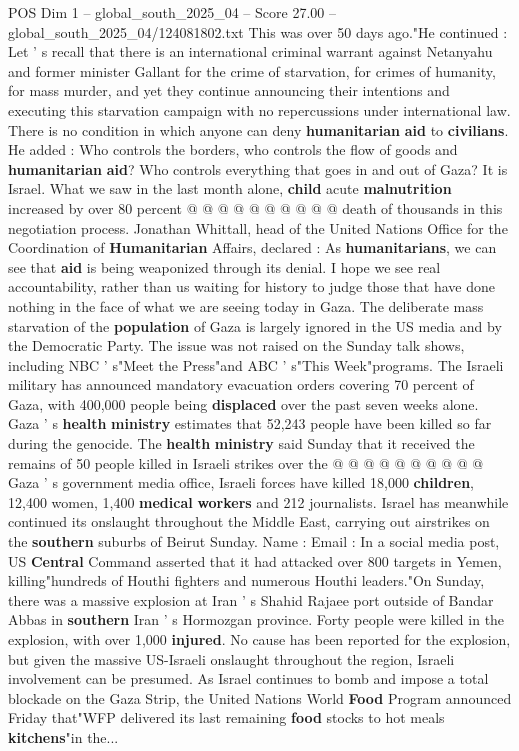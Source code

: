 \begin{textsample}{POS Dim 1 – global\_south\_2025\_04 – Score 27.00 – global\_south\_2025\_04/124081802.txt}
This was over 50 days ago."He continued : Let ' s recall that there is an international criminal warrant against Netanyahu and former minister Gallant for the crime of starvation, for crimes of humanity, for mass murder, and yet they continue announcing their intentions and executing this starvation campaign with no repercussions under international law.
There is no condition in which anyone can deny \textbf{humanitarian} \textbf{aid} to \textbf{civilians}.
He added : Who controls the borders, who controls the flow of goods and \textbf{humanitarian} \textbf{aid}?
Who controls everything that goes in and out of Gaza?
It is Israel.
What we saw in the last month alone, \textbf{child} acute \textbf{malnutrition} increased by over 80 percent @ @ @ @ @ @ @ @ @ @ death of thousands in this negotiation process.
Jonathan Whittall, head of the United Nations Office for the Coordination of \textbf{Humanitarian} Affairs, declared : As \textbf{humanitarians}, we can see that \textbf{aid} is being weaponized through its denial.
I hope we see real accountability, rather than us waiting for history to judge those that have done nothing in the face of what we are seeing today in Gaza.
The deliberate mass starvation of the \textbf{population} of Gaza is largely ignored in the US media and by the Democratic Party.
The issue was not raised on the Sunday talk shows, including NBC ' s"Meet the Press"and ABC ' s"This Week"programs.
The Israeli military has announced mandatory evacuation orders covering 70 percent of Gaza, with 400,000 people being \textbf{displaced} over the past seven weeks alone.
Gaza ' s \textbf{health} \textbf{ministry} estimates that 52,243 people have been killed so far during the genocide.
The \textbf{health} \textbf{ministry} said Sunday that it received the remains of 50 people killed in Israeli strikes over the @ @ @ @ @ @ @ @ @ @ Gaza ' s government media office, Israeli forces have killed 18,000 \textbf{children}, 12,400 women, 1,400 \textbf{medical} \textbf{workers} and 212 journalists.
Israel has meanwhile continued its onslaught throughout the Middle East, carrying out airstrikes on the \textbf{southern} suburbs of Beirut Sunday.
Name : Email : In a social media post, US \textbf{Central} Command asserted that it had attacked over 800 targets in Yemen, killing"hundreds of Houthi fighters and numerous Houthi leaders."On Sunday, there was a massive explosion at Iran ' s Shahid Rajaee port outside of Bandar Abbas in \textbf{southern} Iran ' s Hormozgan province.
Forty people were killed in the explosion, with over 1,000 \textbf{injured}.
No cause has been reported for the explosion, but given the massive US-Israeli onslaught throughout the region, Israeli involvement can be presumed.
As Israel continues to bomb and impose a total blockade on the Gaza Strip, the United Nations World \textbf{Food} Program announced Friday that"WFP delivered its last remaining \textbf{food} stocks to hot meals \textbf{kitchens}"in the...


\end{textsample}
